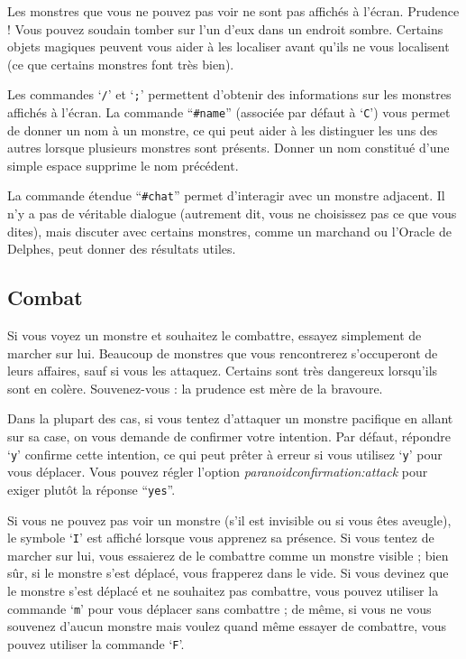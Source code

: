 \documentclass[titlepage]{article}
\begin{document}
Les monstres que vous ne pouvez pas voir ne sont pas affichés à l'écran.  Prudence !
Vous pouvez soudain tomber sur l'un d'eux dans un endroit sombre.  Certains objets
magiques peuvent vous aider à les localiser avant qu'ils ne vous localisent (ce que
certains monstres font très bien).

Les commandes `\texttt{/}' et `\texttt{;}' permettent d'obtenir des informations
sur les
monstres affichés à l'écran.  La commande ``\texttt{\#name}''
(associée par défaut à `\texttt{C}') vous permet
de donner un nom à un monstre, ce qui peut aider à les distinguer
les uns des autres lorsque plusieurs monstres sont présents.  Donner un nom
constitué d'une simple espace supprime le nom précédent.

La commande étendue ``\texttt{\#chat}'' permet d'interagir avec un monstre
adjacent.  Il n'y a pas de véritable dialogue (autrement dit, vous ne choisissez pas
ce que vous dites), mais discuter avec certains monstres, comme un
marchand ou l'Oracle de Delphes, peut donner des résultats utiles.

\subsection*{Combat}

Si vous voyez un monstre et souhaitez le combattre, essayez simplement de
marcher sur lui.  Beaucoup de monstres que vous rencontrerez s'occuperont de leurs
affaires, sauf si vous les attaquez.  Certains sont très dangereux lorsqu'ils sont en colère.
Souvenez-vous : la prudence est mère de la bravoure.

Dans la plupart des cas, si vous tentez d'attaquer un monstre pacifique en
allant sur sa case, on vous demande de confirmer votre intention.  Par
défaut, répondre `\texttt{y}' confirme cette intention,
ce qui peut prêter à erreur si vous utilisez `\texttt{y}' pour vous déplacer.  Vous pouvez régler
l'option \textit{paranoid\textunderscore confirmation:attack}
pour exiger plutôt la réponse ``\texttt{yes}''.

Si vous ne pouvez pas voir un monstre (s'il est invisible ou si vous êtes aveugle),
le symbole `\texttt{I}' est affiché lorsque vous apprenez sa présence.
Si vous tentez de marcher sur lui, vous essaierez de le combattre comme
un monstre visible ; bien sûr,
si le monstre s'est déplacé, vous frapperez dans le vide.  Si vous devinez
que le monstre s'est déplacé et ne souhaitez pas combattre, vous pouvez utiliser la
commande `\texttt{m}' pour vous déplacer sans combattre ; de même, si vous ne vous
souvenez d'aucun monstre mais voulez quand même essayer de combattre, vous pouvez
utiliser la commande `\texttt{F}'.
\end{document}

